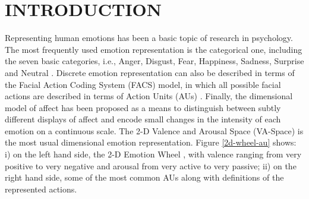 \documentclass[a4paper, 10pt, conference]{ieeeconf}      %
\begin{document}
\begin{comment}
Nevertheless, due to the complexity of human behaviour, it soon became evident that universal expressions are not so commonly displayed in real-world settings. That is why action unit detection became the next step. In parallel, action unit intensity estimation was a step towards representing subtle, i.e., not only extreme, emotions appearing in everyday human computer interactions. It is, however, the dimensional emotion representation, in terms of valence and arousal, which is more appropriate for this task. 
Research in emotion theory requires very large annotated databases of in-the-wild images of facial expressions of emotion. That is why some databases have been developed for the above emotion recognition tasks. The Aff-Wild database was the first large-scale in-the-wild database (around 1,200,000 frames) that was created. However it was annotated in terms of valence and arousal. 
In this paper, we first annotate a part (around $234,000$ frames) of this database in terms of $8$ action units and another part (around $288,000$ frames) in terms of the $7$ basic expressions. To this end, a part of the Aff-Wild database will be annotated for valence arousal, action unit and the seven basic expressions, helping the scientific society into building models for joint emotion estimation or performing domain adaptation techniques. Next, we build state-of-the-art deep neural networks, including convolutional, recurrent and generative adversarial networks, for joint estimation (and generation) of dimensional, categorical and action unit emotion recognition.

\end{comment}


\section{INTRODUCTION}


Representing human emotions has been a basic topic of research in psychology. The most frequently used emotion representation 
is the categorical one, including the seven basic categories, i.e., Anger, Disgust, Fear, Happiness, Sadness, Surprise and Neutral \cite{dalgleish2000handbook}\cite{cowie2003describing}. Discrete emotion representation can also be described in terms of the 
Facial Action Coding System (FACS) model, in which all possible facial actions are described in terms of Action
Units (AUs) \cite{ekman1977facial}. Finally, the dimensional model of affect \cite{whissel1989dictionary}\cite{russell1978evidence} has been proposed as a means to distinguish between subtly different displays of affect and encode small changes in the intensity of each emotion on a continuous scale. The 2-D Valence and Arousal Space (VA-Space) is the most usual dimensional emotion representation. Figure \ref{2d-wheel-au} shows: i) on the left hand side, the 2-D Emotion Wheel \cite{plutchik1980emotion}, with valence ranging from very positive to very negative and arousal from very active to very passive; ii) on the right hand side, some of the most common AUs along with definitions of the represented actions. 
\end{document}
